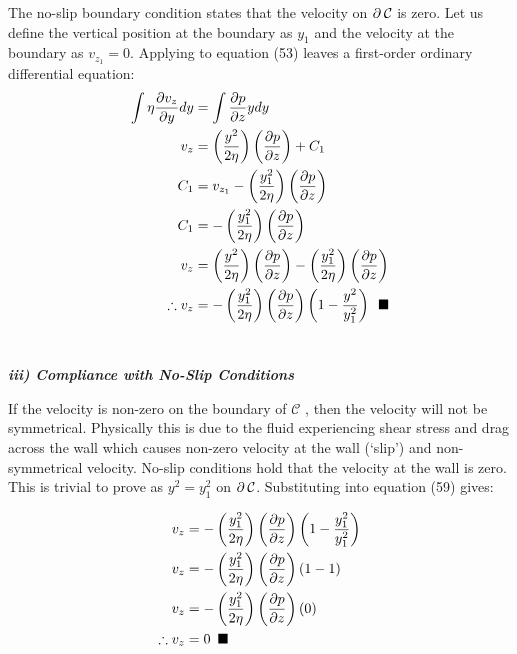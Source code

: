 \documentclass[titlepage]{article}
\begin{document}
    \newpage
    \noindent The no-slip boundary condition states that the velocity on $\partial\hspace*{2pt}\mathcal{C}$ is zero. Let us define the vertical position at the boundary as $y_{1}$ and the velocity at the boundary as $v_{z_{1}}=0$. Applying to equation (53) leaves a first-order ordinary differential equation:
    \begin{align}
        \int{\eta\displaystyle\frac{\partial{v_{z}}}{\partial{y}}dy}&=\int{\displaystyle\frac{\partial{p}}{\partial{z}}ydy} \\
        v_{z}&= \left(\displaystyle\frac{y^2}{2\eta}\right)\left(\displaystyle\frac{\partial{p}}{\partial{z}}\right) + C_{1} \\
        C_{1} &= v_{z_{1}}-\left(\displaystyle\frac{y_{1}^2}{2\eta}\right)\left(\displaystyle\frac{\partial{p}}{\partial{z}}\right) \\
        C_{1}  &=-\left(\displaystyle\frac{y_{1}^2}{2\eta}\right)\left(\displaystyle\frac{\partial{p}}{\partial{z}}\right)\\
        v_{z}  &= \left(\displaystyle\frac{y^2}{2\eta}\right)\left(\displaystyle\frac{\partial{p}}{\partial{z}}\right) -\left(\displaystyle\frac{y_{1}^2}{2\eta}\right)\left(\displaystyle\frac{\partial{p}}{\partial{z}}\right) \\
        \therefore  v_{z} &= -\left(\displaystyle\frac{y_{1}^2}{2\eta}\right)\left(\displaystyle\frac{\partial{p}}{\partial{z}}\right)\left(1-\displaystyle\frac{y^2}{y_{1}^2}\right)\hspace*{5pt}\blacksquare
    \end{align}
\endgroup \\

\begin{center}
    \textbf{\emph{iii) Compliance with No-Slip Conditions}}
\end{center}
If the velocity is non-zero on the boundary of $\mathcal{C}$ , then the velocity will not be symmetrical. Physically this is due to the fluid experiencing shear stress and drag across the wall which causes non-zero velocity at the wall (`slip') and non-symmetrical velocity. No-slip conditions hold that the velocity at the wall is zero. This is trivial to prove as $y^2=y_{1}^2$ on $\partial\hspace*{2pt}\mathcal{C}$. Substituting into equation  (59) gives: 

\begin{align}
    v_{z} &= -\left(\displaystyle\frac{y_{1}^2}{2\eta}\right)\left(\displaystyle\frac{\partial{p}}{\partial{z}}\right)\left(1-\displaystyle\frac{y_{1}^2}{y_{1}^2}\right) \\
    v_{z} &= -\left(\displaystyle\frac{y_{1}^2}{2\eta}\right)\left(\displaystyle\frac{\partial{p}}{\partial{z}}\right)\left(1-1\right) \\
    v_{z} &= -\left(\displaystyle\frac{y_{1}^2}{2\eta}\right)\left(\displaystyle\frac{\partial{p}}{\partial{z}}\right)\left(0\right) \\
    \therefore v_{z} &= 0 \hspace*{5pt} \blacksquare
\end{align}
\end{document}
